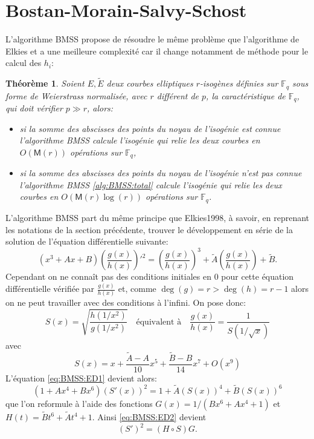 \documentclass[10pt,a4paper]{book}
\theoremstyle{plain}
\newtheorem{thm}{Théorème}[chapter]
\theoremstyle{definition}
\theoremstyle{definition}
\theoremstyle{definition}
\theoremstyle{definition}
\theoremstyle{remark}
\theoremstyle{remark}
\theoremstyle{definition}
\begin{document}
\section{Bostan-Morain-Salvy-Schost}
L'algorithme BMSS \cite{BMSS08} propose de résoudre le même problème que 
l'algorithme de Elkies \cite{elkies1998} et a une meilleure complexité car 
il change notamment de méthode pour le calcul des $h_i$:
\begin{thm}
\label{thm:BMSS}
Soient $E, \tilde{E}$ deux courbes elliptiques $r$-isogènes définies sur 
$\mathbb{F}_q$ sous forme de Weierstrass normalisée, avec $r$ différent de 
$p$, la caractéristique de $\mathbb{F}_q$, qui doit vérifier 
$p \gg r$, alors:
\begin{itemize}
\item  si la somme des abscisses des points du noyau de l'isogénie est connue 
l'algorithme BMSS  calcule l'isogénie qui relie les deux courbes en 
$O(\mathsf{M}(r))$ opérations sur $\mathbb{F}_q$,
\item si la somme des abscisses des points du noyau de l'isogénie n'est pas 
connue l'algorithme BMSS \ref{alg:BMSS:total} calcule l'isogénie qui relie les 
deux courbes en $O(\mathsf{M}(r)\log(r))$ opérations sur $\mathbb{F}_q$.
\end{itemize}
\end{thm}

L'algorithme BMSS part du même principe que Elkies1998, à savoir, en reprenant 
les notations de la section précédente, trouver le développement en série de la
solution de l'équation différentielle suivante:   
\begin{equation}
\label{eq:BMSS:ED1}
(x^3+Ax+B)\left(\frac{g(x)}{h(x)} \right)'^2=  \left(\frac{g(x)}{h(x)} \right)^3 + \tilde{A} \left(\frac{g(x)}{h(x)} \right) + \tilde{B}.
\end{equation}
Cependant on ne connaît pas des conditions initiales en $0$ pour cette équation
différentielle vérifiée par $\frac{g(x)}{h(x)}$ et, comme $\deg(g)=r> \deg(h)= 
r-1$ alors on ne peut travailler avec des conditions à l'infini. On pose donc:
\begin{equation}
S(x)=\sqrt{\frac{h(1/x^2)}{g(1/x^2)}} \quad \text{équivalent à} \quad \frac{g(x)}{h(x)}=\frac{1}{S(1/\sqrt{x})}
\end{equation} 
avec 
\begin{equation}
S(x)=x + \frac{\tilde{A}-A}{10}x^5+\frac{\tilde{B}-B}{14}x^7+O(x^9)
\end{equation}
L'équation \eqref{eq:BMSS:ED1} devient alors:
\begin{equation}
\label{eq:BMSS:ED2}
(1+Ax^4+Bx^6)(S'(x))^2=1+\tilde{A}(S(x))^4+\tilde{B}(S(x))^6
\end{equation}
que l'on reformule à l'aide des fonctions $G(x)=1/(Bx^6+Ax^4+1)$ et $H(t)=\tilde{B}t^6+\tilde{A}t^4+1$. Ainsi \eqref{eq:BMSS:ED2} devient 
\begin{equation}
\label{eq:BMSS:ED3}
(S')^2=(H \circ S) G.
\end{equation}
\end{document}
